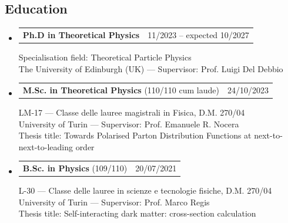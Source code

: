 \documentclass[10pt,a4paper]{article}
\makeatletter
\newcommand{\headerrow}[2]
{\begin{tabular*}{\linewidth}{l@{\extracolsep{\fill}}r}
	#1 &
	#2 \\
\end{tabular*}}
\makeatother
\begin{document}
\subsection*{Education}
\begin{itemize}[leftmargin=1em]
  \item[] 
  \headerrow
		{\textbf{Ph.D in Theoretical Physics}}
    {11/2023 – expected 10/2027}
    Specialisation field: Theoretical Particle Physics\\
    The University of Edinburgh (UK) — Supervisor: Prof. Luigi Del Debbio
  \item[]
  \headerrow
    {\textbf{M.Sc. in Theoretical Physics} (110/110 cum laude)}
    {24/10/2023}
    LM-17 — Classe delle lauree magistrali in Fisica, D.M. 270/04\\
    University of Turin — Supervisor: Prof. Emanuele R. Nocera\\
    Thesis title: Towards Polarised Parton Distribution Functions at next-to-next-to-leading order
  \item[]
  \headerrow
    {\textbf{B.Sc. in Physics} (109/110)}
    {20/07/2021}
    L-30 — Classe delle lauree in scienze e tecnologie fisiche, D.M. 270/04\\
    University of Turin — Supervisor: Prof. Marco Regis\\
    Thesis title: Self-interacting dark matter: cross-section calculation
\end{itemize}

\end{document}
